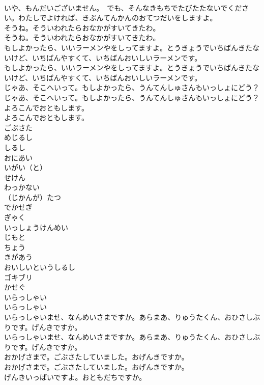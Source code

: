 \documentclass[8pt]{extreport}
\begin{document}
\begin{CJK}{UTF8}{min}
\\	いや、もんだいございません。　でも、そんなきもちでたびたたないでください。わたしでよければ、きぶんてんかんのおてつだいをしますよ。 
\\	そうね。そういわれたらおなかがすいてきたわ。	
\\	そうね。そういわれたらおなかがすいてきたわ。 
\\	もしよかったら、いいラーメンやをしってますよ。とうきょうでいちばんきたないけど、いちばんやすくて、いちばんおいしいラーメンです。	
\\	もしよかったら、いいラーメンやをしってますよ。とうきょうでいちばんきたないけど、いちばんやすくて、いちばんおいしいラーメンです。 
\\	じゃあ、そこへいって。もしよかったら、うんてんしゅさんもいっしょにどう？	
\\	じゃあ、そこへいって。もしよかったら、うんてんしゅさんもいっしょにどう？ 
\\	よろこんでおともします。	
\\	よろこんでおともします。 
\\	ごぶさた
\\	めじるし
\\	しるし
\\	おにあい
\\	いがい（と）
\\	せけん
\\	わっかない
\\	（じかんが）たつ
\\	でかせぎ
\\	ぎゃく
\\	いっしょうけんめい
\\	じもと
\\	ちょう
\\	きがあう
\\	おいしいというしるし
\\	ゴキブリ
\\	かせぐ
\\	いらっしゃい	
\\	いらっしゃい 
\\	いらっしゃいませ、なんめいさまですか。あらまあ、りゅうたくん、おひさしぶりです。げんきですか。	
\\	いらっしゃいませ、なんめいさまですか。あらまあ、りゅうたくん、おひさしぶりです。げんきですか。 
\\	おかげさまで。ごぶさたしていました。おげんきですか。	
\\	おかげさまで。ごぶさたしていました。おげんきですか。 
\\	げんきいっぱいですよ。おともだちですか。	

\end{CJK}
\end{document}
